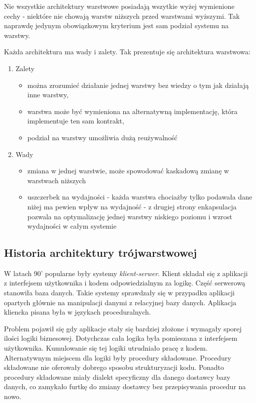 \documentclass[a4paper,onecolumn,oneside,11pt,wide,floatssmall]{mwrep}
\theoremstyle{definition}
\theoremstyle{plain}%
\theoremstyle{remark}
\begin{document}
Nie wszystkie architektury warstwowe posiadają wszytkie wyżej wymienione cechy - niektóre nie chowają warstw niższych 
przed warstwami wyższymi. Tak naprawdę jedynym obowiązkowym kryterium jest sam podział systemu na warstwy.

Każda architektura ma wady i zalety. Tak prezentuje się architektura warstwowa:

\begin{enumerate}
  \item Zalety
    \begin{itemize}
      \item można zrozumieć działanie jednej warstwy bez wiedzy o tym jak działają inne warstwy,
      \item warstwa może być wymieniona na alternatywną implementację, która implementuje ten sam kontrakt,
      \item podział na warstwy umożliwia dużą reużywalność
    \end{itemize}
  \item Wady
    \begin{itemize}
      \item zmiana w jednej warstwie, może spowodować kaskadową zmianę w warstwach niższych
      \item uszczerbek na wydajności - każda warstwa chociażby tylko podawała dane niżej ma pewien wpływ na wydajność -
       z drugiej strony enkapsulacja pozwala na optymalizację jednej warstwy niskiego poziomu i wzrost wydajności w 
       całym systemie
    \end{itemize}
\end{enumerate}

\subsection{Historia architektury trójwarstwowej}
W latach 90' popularne były systemy \emph{klient-serwer}. Klient składał się z aplikacji z interfejsem użytkownika i 
kodem odpowiedzialnym za logikę. Część serwerową stanowiła baza danych. Takie systemy sprawdzały się w przypadku 
aplikacji opartych głównie na manipulacji danymi z relacyjnej bazy danych. Aplikacja kliencka pisana była w językach 
proceduralnych.

Problem pojawił się gdy aplikacje stały się bardziej złożone i wymagały sporej ilości logiki biznesowej. Dotychczas 
cała logika była pomieszana z interfejsem użytkownika. Kumulowanie się tej logiki utrudniało pracę z kodem. 
Alternatywnym miejscem dla logiki były procedury składowane. Procedury składowane nie oferowały dobrego sposobu 
strukturyzacji kodu. Ponadto procedury składowane miały dialekt specyficzny dla danego dostawcy bazy danych, co 
zamykało furtkę do zmiany dostawcy bez przepisywania procedur na nowo. 
\end{document}
